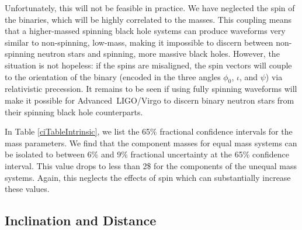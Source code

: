 \documentclass[11pt,a4paper]{emulateapj}
\begin{document}
Unfortunately, this will not be feasible in practice.  We have neglected the spin of the binaries, which will be highly
correlated to the masses.  This coupling means that a higher-massed spinning black hole systems can produce
 waveforms very similar to non-spinning, low-mass, making it impossible to discern between non-spinning neutron stars
 and spinning, more massive black holes.  However, the situation is not hopeless: if the spins are misaligned, the spin 
 vectors will couple to the orientation of the binary (encoded in the three angles $\phi_0$, $\iota$, and $\psi$) via
 relativistic precession.  It remains to be seen if using fully spinning waveforms will make it possible for Advanced\
  LIGO/Virgo to discern binary neutron stars from their spinning black hole counterparts. 

In Table \ref{ciTableIntrinsic}, we list the 65\% fractional confidence intervals for the mass parameters.  We find that the 
component masses for equal mass systems can be isolated to between 6\% and 9\% fractional uncertainty at the 65\% confidence interval.  This value drops to less than 2\$ for the components of the unequal mass systems.  Again, this 
neglects the effects of spin which can substantially increase these values.


\subsection{Inclination and Distance}
\label{idSection}
\end{document}
